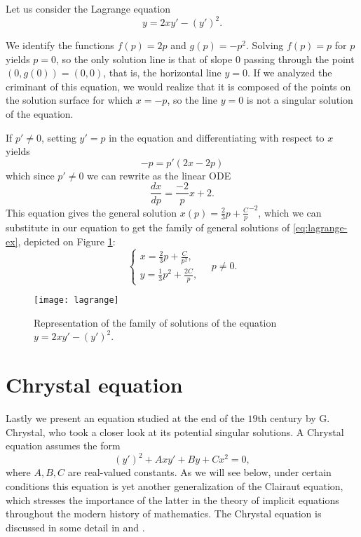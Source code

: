 \begin{example} Let us consider the Lagrange equation
  \begin{equation}\label{eq:lagrange-ex}
    y=2xy'-(y')^2.
  \end{equation}

We identify the functions $f(p)=2p$ and $g(p)=-p^2$. Solving $f(p)=p$ for $p$ yields $p=0$, so the only solution line is that of slope $0$ passing through the point $(0,g(0))=(0,0)$, that is, the horizontal line $y=0$. If we analyzed the criminant of this equation, we would realize that it is composed of the points on the solution surface for which $x=-p$, so the line $y=0$ is not a singular solution of the equation.

If $p'\neq 0$, setting $y'=p$ in the equation and differentiating with respect to $x$ yields
\[
-p=p'(2x-2p)
\]
which since $p'\neq 0$ we can rewrite as the linear ODE
\[
\frac{dx}{dp}= \frac{-2}{p}x + 2.
\]
This equation gives the general solution $x(p)=\frac{2}{3}p+\frac{C}p^{-2}$, which we can substitute in our equation to get the family of general solutions of \eqref{eq:lagrange-ex}, depicted on Figure \ref{fig:lagrange}:
\[
\begin{cases}
  \displaystyle x=\frac{2}{3}p+\frac{C}{p^2},\\
  \displaystyle y=\frac{1}{3}p^2+\frac{2C}{p},
\end{cases}\quad p \neq 0.
\]

\begin{figure}[h!]
\centering
\texttt{[image: lagrange]}
\caption{Representation of the family of solutions of the equation $y=2xy'-(y')^2$.}
\label{fig:lagrange}
\end{figure}

\end{example}

\section{Chrystal equation}

Lastly we present an equation studied at the end of the $19$th century by G. Chrystal, who took a closer look at its potential singular solutions. A Chrystal equation assumes the form
\begin{equation} \label{eq:chrystal}
  (y')^2 + Axy' + By + Cx^2=0,
\end{equation}
where $A,B,C$ are real-valued constants. As we will see below, under certain conditions this equation is yet another generalization of the Clairaut equation, which stresses the importance of the latter in the theory of implicit equations throughout the modern history of mathematics. The Chrystal equation is discussed in some detail in \cite{ince1956ordinary} and \cite{davis1962introduction}.


